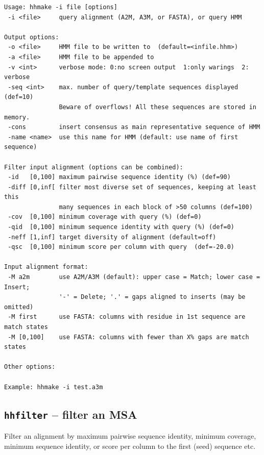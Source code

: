 \documentclass[11pt,a4paper]{article}
\begin{document}
\small 
\begin{verbatim}
Usage: hhmake -i file [options]                                       
 -i <file>     query alignment (A2M, A3M, or FASTA), or query HMM         

Output options:                                                           
 -o <file>     HMM file to be written to  (default=<infile.hhm>)          
 -a <file>     HMM file to be appended to                                 
 -v <int>      verbose mode: 0:no screen output  1:only warings  2: verbose
 -seq <int>    max. number of query/template sequences displayed (def=10)  
               Beware of overflows! All these sequences are stored in memory.
 -cons         insert consensus as main representative sequence of HMM 
 -name <name>  use this name for HMM (default: use name of first sequence)   

Filter input alignment (options can be combined):                         
 -id   [0,100] maximum pairwise sequence identity (%) (def=90)   
 -diff [0,inf[ filter most diverse set of sequences, keeping at least this    
               many sequences in each block of >50 columns (def=100)
 -cov  [0,100] minimum coverage with query (%) (def=0) 
 -qid  [0,100] minimum sequence identity with query (%) (def=0) 
 -neff [1,inf] target diversity of alignment (default=off)
 -qsc  [0,100] minimum score per column with query  (def=-20.0)

Input alignment format:                                                    
 -M a2m        use A2M/A3M (default): upper case = Match; lower case = Insert;
               '-' = Delete; '.' = gaps aligned to inserts (may be omitted)   
 -M first      use FASTA: columns with residue in 1st sequence are match states
 -M [0,100]    use FASTA: columns with fewer than X% gaps are match states   

Other options:                                                               

Example: hhmake -i test.a3m 
\end{verbatim} 
\normalsize


\subsection{{\tt hhfilter} -- filter an MSA}

Filter an alignment by maximum pairwise sequence identity, minimum coverage,
minimum sequence identity, or score per column to the first (seed) sequence etc.
\end{document}
